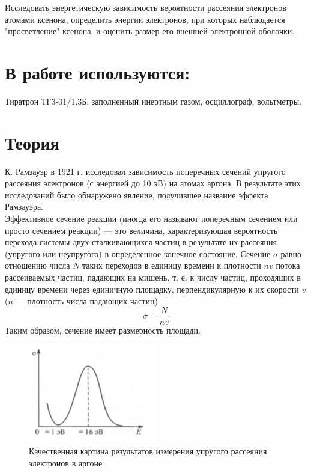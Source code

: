 \documentclass[14pt,a4paper]{scrartcl}
\begin{document}
Исследовать энергетическую зависимость вероятности рассеяния электронов атомами ксенона, определить энергии электронов, при которых наблюдается "просветление" ксенона, и оценить размер его внешней электронной оболочки.

\section{В работе используются:}
Тиратрон ТГ3-01/1.3Б, заполненный инертным газом, осциллограф, вольтметры.





\section{Теория}
К. Рамзауэр в 1921 г. исследовал зависимость поперечных сечений упругого рассеяния электронов (с энергией до 10 эВ) на атомах аргона. В результате этих исследований было обнаружено явление, получившее название эффекта Рамзауэра. \\

Эффективное сечение реакции (иногда его называют поперечным сечением или просто сечением реакции) — это величина, характеризующая вероятность перехода системы двух сталкивающихся частиц в результате их рассеяния (упругого или неупругого) в определенное конечное состояние. Сечение $\sigma$ равно отношению числа $N$ таких переходов в единицу времени к плотности $nv$ потока рассеиваемых частиц, падающих на мишень, т. е. к числу частиц, проходящих в единицу времени через единичную площадку, перпендикулярную к их скорости $v$ ($n$ — плотность числа падающих частиц)
\begin{equation}
\sigma = \frac{N}{nv}
\end{equation}
Таким образом, сечение имеет размерность площади. \\


\begin{figure}[h]
\begin{center}
\includegraphics[width = 0.5\textwidth]{graph.png}
\caption{Качественная картина результатов измерения упругого рассеяния электронов в аргоне}
\end{center}
\end{figure}
\end{document}
